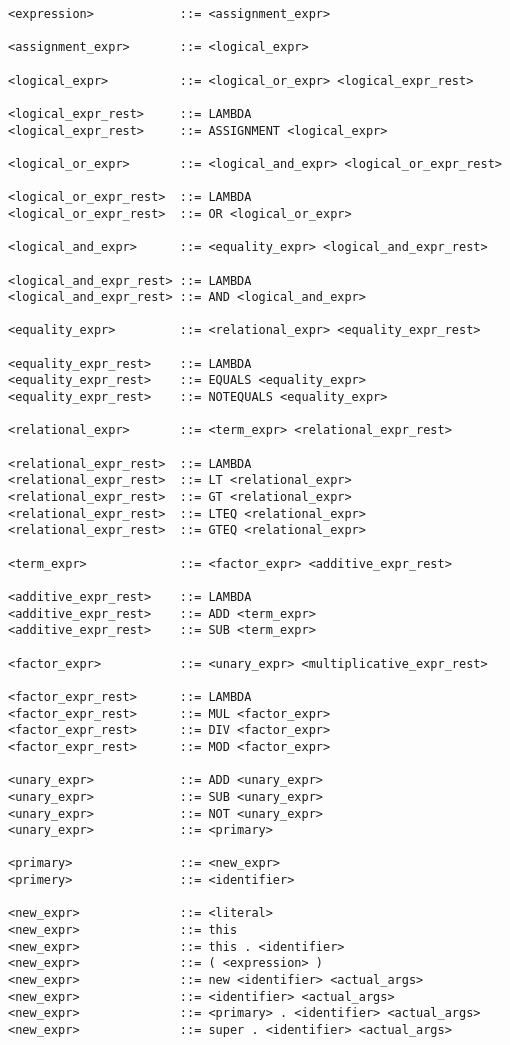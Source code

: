 \documentclass [a4paper,titlepage]{report}
\begin{document}
\begin{verbatim}
<expression>            ::= <assignment_expr>

<assignment_expr>       ::= <logical_expr>

<logical_expr>          ::= <logical_or_expr> <logical_expr_rest>

<logical_expr_rest>     ::= LAMBDA
<logical_expr_rest>     ::= ASSIGNMENT <logical_expr>

<logical_or_expr>       ::= <logical_and_expr> <logical_or_expr_rest>

<logical_or_expr_rest>  ::= LAMBDA
<logical_or_expr_rest>  ::= OR <logical_or_expr>

<logical_and_expr>      ::= <equality_expr> <logical_and_expr_rest>

<logical_and_expr_rest> ::= LAMBDA
<logical_and_expr_rest> ::= AND <logical_and_expr>

<equality_expr>         ::= <relational_expr> <equality_expr_rest>

<equality_expr_rest>    ::= LAMBDA
<equality_expr_rest>    ::= EQUALS <equality_expr>
<equality_expr_rest>    ::= NOTEQUALS <equality_expr>

<relational_expr>       ::= <term_expr> <relational_expr_rest>

<relational_expr_rest>  ::= LAMBDA
<relational_expr_rest>  ::= LT <relational_expr>
<relational_expr_rest>  ::= GT <relational_expr>
<relational_expr_rest>  ::= LTEQ <relational_expr>
<relational_expr_rest>  ::= GTEQ <relational_expr>

<term_expr>             ::= <factor_expr> <additive_expr_rest>

<additive_expr_rest>    ::= LAMBDA
<additive_expr_rest>    ::= ADD <term_expr>
<additive_expr_rest>    ::= SUB <term_expr>

<factor_expr>           ::= <unary_expr> <multiplicative_expr_rest>

<factor_expr_rest>      ::= LAMBDA
<factor_expr_rest>      ::= MUL <factor_expr>
<factor_expr_rest>      ::= DIV <factor_expr>
<factor_expr_rest>      ::= MOD <factor_expr>

<unary_expr>            ::= ADD <unary_expr>
<unary_expr>            ::= SUB <unary_expr>
<unary_expr>            ::= NOT <unary_expr>
<unary_expr>            ::= <primary>

<primary>               ::= <new_expr>
<primery>               ::= <identifier>

<new_expr>              ::= <literal>
<new_expr>              ::= this
<new_expr>              ::= this . <identifier>
<new_expr>              ::= ( <expression> )
<new_expr>              ::= new <identifier> <actual_args>
<new_expr>              ::= <identifier> <actual_args>
<new_expr>              ::= <primary> . <identifier> <actual_args>
<new_expr>              ::= super . <identifier> <actual_args>


\end{verbatim}
\end{document}
